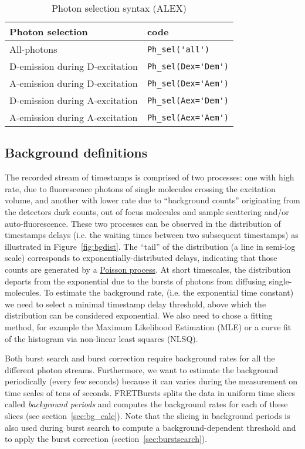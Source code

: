 \begin{table}
\begin{tabular}{l|l}
  Photon selection  & code \\
  \hline
  All-photons & \verb|Ph_sel('all')|\\
  D-emission during D-excitation & \verb|Ph_sel(Dex='Dem')|\\
  A-emission during D-excitation & \verb|Ph_sel(Dex='Aem')|\\
  D-emission during A-excitation & \verb|Ph_sel(Aex='Dem')|\\
  A-emission during A-excitation & \verb|Ph_sel(Aex='Aem')|\\
\end{tabular}
\caption{\label{tab:ph_sel_alex}Photon selection syntax (ALEX)}
\end{table}

\subsection{Background definitions}
\label{sec:bg_intro}

The recorded stream of timestamps is comprised of two processes: one with 
high rate, due to fluorescence photons of single molecules crossing the 
excitation volume, and another with lower rate due to “background
counts” originating from the detectors dark counts, out of focus molecules
and sample scattering and/or auto-fluorescence\cite{Gopich_2008}. 
These two processes can be 
observed in the distribution of timestamps delays (i.e. the waiting times 
between two subsequent timestamps) as illustrated in Figure~\ref{fig:bgdist}.
The “tail” of the distribution (a line in semi-log scale) corresponds 
to exponentially-distributed delays, indicating that those counts are generated by a
\href{http://en.wikipedia.org/wiki/Poisson_process}{Poisson process}. At short
timescales, the distribution departs from the exponential due to the bursts of
photons from diffusing single-molecules. To estimate the background
rate, (i.e. the exponential time constant) we need to select a minimal
timestamp delay threshold, above which the distribution can be considered exponential. We also need to chose a fitting method, for example the Maximum
Likelihood Estimation (MLE) or a curve fit of the histogram via non-linear
least squares (NLSQ).

Both burst search and burst correction require background rates for all the
different photon streams. Furthermore, we want to estimate the background
periodically (every few seconds) because it can varies during the measurement on
time scales of tens of seconds. FRETBursts splits the data in uniform time
slices called \textit{background periods} and computes the background rates for
each of these slices (see section~\ref{sec:bg_calc}). Note that the slicing 
in background
periods is also used during burst search to compute a background-dependent
threshold and to apply the burst correction (section~\ref{sec:burstsearch}).

